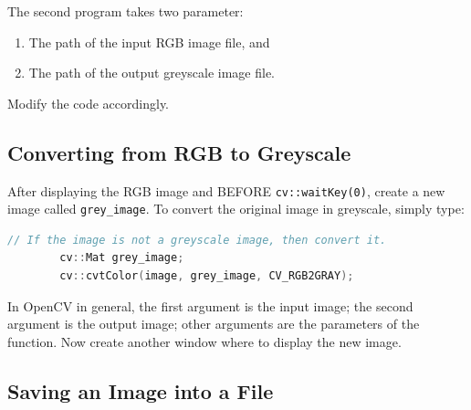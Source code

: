 \documentclass[english,a4paper,12pt,oneside]{article}
\begin{document}
The second program takes two parameter:
\begin{enumerate}
 \item  The path of the input RGB image file, and
 \item  The path of the output greyscale image file.
\end{enumerate}
Modify the code accordingly. 


\subsection{Converting from RGB to Greyscale}

After displaying the RGB image and BEFORE \verb+cv::waitKey(0)+, create a new image called \verb+grey_image+. 
To convert the original image in greyscale, simply type:
\begin{lstlisting}[language=c++,caption=Convert the color model of the image.]
        // If the image is not a greyscale image, then convert it.
        cv::Mat grey_image;
        cv::cvtColor(image, grey_image, CV_RGB2GRAY);
\end{lstlisting}

In OpenCV in general, the first argument is the input image; the second argument is the output image; other arguments are the parameters of the function. 
Now create another window where to display the new image. 

\subsection{Saving an Image into a File}
\end{document}
